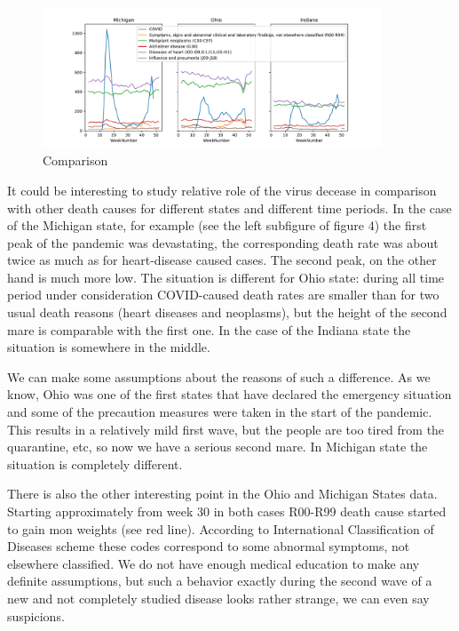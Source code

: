 \documentclass[conference]{IEEEtran}
\begin{document}
\begin{figure}
  \centering
  \includegraphics[width=0.9\textwidth]{figs/weekly_deaths}
  \caption{Comparison}
  \label{fig:weekly_deaths}
\end{figure}

It could be interesting to study relative role of the virus decease in comparison with other death causes for different states and different time periods. In the case of the Michigan state, for example (see the left subfigure of figure 4) the first peak of the pandemic was devastating, the corresponding death rate was about twice as much as for heart-disease caused cases. The second peak, on the other hand is much more low. The situation is different for Ohio state: during all time period under consideration COVID-caused death rates are smaller than for two usual death reasons (heart diseases and neoplasms), but the height of the second mare is comparable with the first one. In the case of the Indiana state the situation is somewhere in the middle.

We can make some assumptions about the reasons of such a difference. As we know, Ohio was one of the first states that have declared the emergency situation and some of the precaution measures were taken in the start of the pandemic. This results in a relatively mild first wave, but the people are too tired from the quarantine, etc, so now we have a serious second mare. In Michigan state the situation is completely different.

There is also the other interesting point in the Ohio and Michigan States data. Starting approximately from week 30 in both cases R00-R99 death cause started to gain mon weights (see red line). According to  International Classification of Diseases scheme  \cite{ICD-10} these codes correspond to some abnormal symptoms, not elsewhere classified. We do not have enough medical education to make any definite assumptions, but such a behavior exactly during the second wave of a new and not completely studied disease looks rather strange, we can even say suspicions.
\end{document}
